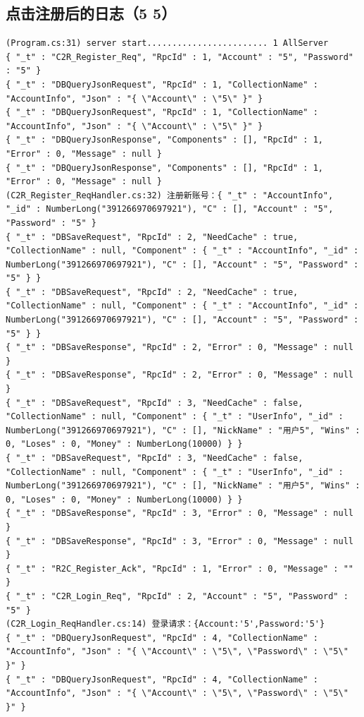 \documentclass[9pt, b5paper]{article}
\begin{document}
\subsection{点击注册后的日志（5  5）}
\label{sec-3-3}
\begin{verbatim}
(Program.cs:31) server start........................ 1 AllServer
{ "_t" : "C2R_Register_Req", "RpcId" : 1, "Account" : "5", "Password" : "5" }
{ "_t" : "DBQueryJsonRequest", "RpcId" : 1, "CollectionName" : "AccountInfo", "Json" : "{ \"Account\" : \"5\" }" }
{ "_t" : "DBQueryJsonRequest", "RpcId" : 1, "CollectionName" : "AccountInfo", "Json" : "{ \"Account\" : \"5\" }" }
{ "_t" : "DBQueryJsonResponse", "Components" : [], "RpcId" : 1, "Error" : 0, "Message" : null }
{ "_t" : "DBQueryJsonResponse", "Components" : [], "RpcId" : 1, "Error" : 0, "Message" : null }
(C2R_Register_ReqHandler.cs:32) 注册新账号：{ "_t" : "AccountInfo", "_id" : NumberLong("391266970697921"), "C" : [], "Account" : "5", "Password" : "5" }
{ "_t" : "DBSaveRequest", "RpcId" : 2, "NeedCache" : true, "CollectionName" : null, "Component" : { "_t" : "AccountInfo", "_id" : NumberLong("391266970697921"), "C" : [], "Account" : "5", "Password" : "5" } }
{ "_t" : "DBSaveRequest", "RpcId" : 2, "NeedCache" : true, "CollectionName" : null, "Component" : { "_t" : "AccountInfo", "_id" : NumberLong("391266970697921"), "C" : [], "Account" : "5", "Password" : "5" } }
{ "_t" : "DBSaveResponse", "RpcId" : 2, "Error" : 0, "Message" : null }
{ "_t" : "DBSaveResponse", "RpcId" : 2, "Error" : 0, "Message" : null }
{ "_t" : "DBSaveRequest", "RpcId" : 3, "NeedCache" : false, "CollectionName" : null, "Component" : { "_t" : "UserInfo", "_id" : NumberLong("391266970697921"), "C" : [], "NickName" : "用户5", "Wins" : 0, "Loses" : 0, "Money" : NumberLong(10000) } }
{ "_t" : "DBSaveRequest", "RpcId" : 3, "NeedCache" : false, "CollectionName" : null, "Component" : { "_t" : "UserInfo", "_id" : NumberLong("391266970697921"), "C" : [], "NickName" : "用户5", "Wins" : 0, "Loses" : 0, "Money" : NumberLong(10000) } }
{ "_t" : "DBSaveResponse", "RpcId" : 3, "Error" : 0, "Message" : null }
{ "_t" : "DBSaveResponse", "RpcId" : 3, "Error" : 0, "Message" : null }
{ "_t" : "R2C_Register_Ack", "RpcId" : 1, "Error" : 0, "Message" : "" }
{ "_t" : "C2R_Login_Req", "RpcId" : 2, "Account" : "5", "Password" : "5" }
(C2R_Login_ReqHandler.cs:14) 登录请求：{Account:'5',Password:'5'}
{ "_t" : "DBQueryJsonRequest", "RpcId" : 4, "CollectionName" : "AccountInfo", "Json" : "{ \"Account\" : \"5\", \"Password\" : \"5\" }" }
{ "_t" : "DBQueryJsonRequest", "RpcId" : 4, "CollectionName" : "AccountInfo", "Json" : "{ \"Account\" : \"5\", \"Password\" : \"5\" }" }

\end{verbatim}
\end{document}
